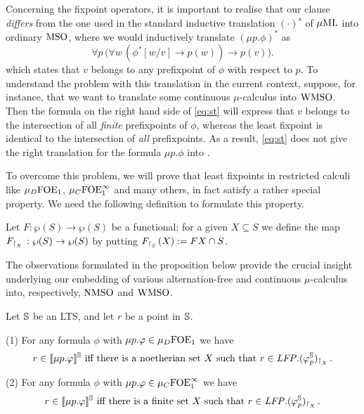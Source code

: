 Concerning the fixpoint operators, it is important to realise that our clause
\emph{differs} from the one used in the standard inductive translation 
$(\cdot)^{s}$ of $\mu\mathrm{ML}$ into ordinary $\mathrm{MSO}$, where we would inductively
translate $(\mu p. \phi)^{*}$ as
\begin{equation}
\label{eq:st}
\forall p\, \big( \forall w\, (\phi^{*}[w/v] \to p(w)) \to p(v) \big).
\end{equation}
which states that $v$ belongs to any prefixpoint of $\phi$ with respect to $p$.
To understand the problem with this translation in the current context, suppose,
for instance, that we want to translate some continuous $\mu$-calculus into
$\mathrm{WMSO}$.
Then the formula on the right hand side of \eqref{eq:st} will express that $v$ 
belongs to the intersection of all \emph{finite} prefixpoints of $\phi$, whereas
the least fixpoint is identical to the intersection of \emph{all} prefixpoints.
As a result, \eqref{eq:st} does not give the right translation for the formula 
$\mu p.\phi$ into \wmso.

To overcome this problem, we will prove that least fixpoints in restricted 
calculi like $\mu_{D}\mathrm{FOE}_1$, $\mu_{C}\mathrm{FOE}^{\infty}_1$ and many others, in fact satisfy a
rather special property.
We need the following definition to formulate this property.

\begin{definition}
\label{d:rst}
Let $F: \wp(S)\to \wp(S)$ be a functional; for a given $X \subseteq S$ we define
the map $F_{{\upharpoonright}_{X}\,}: \wp(S)\to \wp(S)$ by putting $F_{{\upharpoonright}_{S}\,}(X) := FX \cap S$.
\end{definition}

The observations formulated in the proposition below provide the crucial insight
underlying our embedding of various alternation-free and continuous 
$\mu$-calculus into, respectively, $\mathrm{NMSO}$ and $\mathrm{WMSO}$.

\begin{proposition}
\label{p:afmc-rstGen}
\label{p:keyfix}
Let $\mathbb{S}$ be an LTS, and let $r$ be a point in $\mathbb{S}$.

(1) For any formula $\phi$ with $\mu p. \varphi \in \mu_{D}\mathrm{FOE}_1$ we have
\begin{equation}
\label{eq:foe-d}
r \in \mng{\mu p.\phi}^{\model} \text{ iff there is a noetherian set $X$ such 
that } r \in \LFP. (\phi^{\model}_{p})_{\rst{X}}.
\end{equation}

(2) For any formula $\phi$ with $\mu p. \varphi \in \mu_{C}\mathrm{FOE}^{\infty}_1$ we have
\begin{equation}
\label{eq:foei-c}
r \in \mng{\mu p.\phi}^{\model} \text{ iff there is a finite set $X$ such 
that } r \in \LFP. (\phi^{\model}_{p})_{\rst{X}}.
\end{equation}
\end{proposition}

